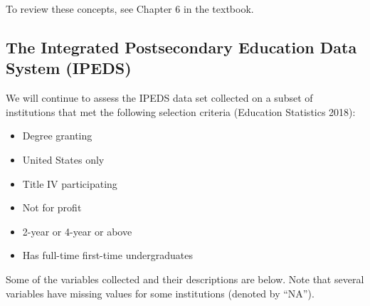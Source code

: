 \documentclass[
]{report}
\begin{document}
To review these concepts, see Chapter 6 in the textbook.

\subsection{The Integrated Postsecondary Education Data System (IPEDS)}\label{the-integrated-postsecondary-education-data-system-ipeds}

We will continue to assess the IPEDS data set collected on a subset of institutions that met the following selection criteria (Education Statistics 2018):

\begin{itemize}
\item
  Degree granting
\item
  United States only
\item
  Title IV participating
\item
  Not for profit
\item
  2-year or 4-year or above
\item
  Has full-time first-time undergraduates
\end{itemize}

Some of the variables collected and their descriptions are below. Note that several variables have missing values for some institutions (denoted by ``NA'').
\end{document}
